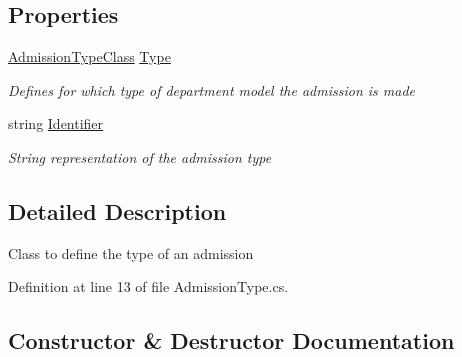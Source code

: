 \subsection*{Properties}
\begin{DoxyCompactItemize}
\item 
\hyperlink{namespace_enums_a2d94ac8cd083deb7c44bcb8c8e3c5eea}{Admission\+Type\+Class} \hyperlink{class_general_health_care_elements_1_1_treatment_admission_types_1_1_admission_type_a658049b2a277d4cde9c50d2d94ebd4dc}{Type}
\begin{DoxyCompactList}\small\item\em Defines for which type of department model the admission is made \end{DoxyCompactList}\item 
string \hyperlink{class_general_health_care_elements_1_1_treatment_admission_types_1_1_admission_type_affd4218fcdd5162ea5e0fb3e653d172a}{Identifier}
\begin{DoxyCompactList}\small\item\em String representation of the admission type \end{DoxyCompactList}\end{DoxyCompactItemize}


\subsection{Detailed Description}
Class to define the type of an admission 



Definition at line 13 of file Admission\+Type.\+cs.



\subsection{Constructor \& Destructor Documentation}

